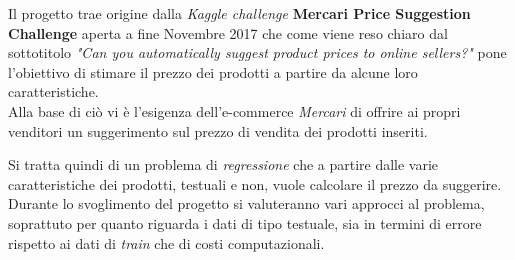 



Il progetto trae origine dalla \textit{Kaggle challenge} \textbf{Mercari Price
Suggestion Challenge}\cite{mercari-price-suggestion-challenge} aperta a fine
Novembre 2017 che come viene reso chiaro dal sottotitolo \textit{"Can you
automatically suggest product prices to online sellers?"} pone l'obiettivo di
stimare il prezzo dei prodotti a partire da alcune loro caratteristiche. \\
Alla base di ciò vi è l'esigenza dell'e-commerce \textit{Mercari}\cite{mercari}
di offrire ai propri venditori un suggerimento sul prezzo di vendita dei
prodotti inseriti.

Si tratta quindi di un problema di \textit{regressione} che a partire dalle
varie caratteristiche dei prodotti, testuali e non, vuole calcolare il prezzo da
suggerire.
\\
Durante lo svoglimento del progetto si valuteranno vari approcci al problema,
soprattuto per quanto riguarda i dati di tipo testuale, sia in termini di errore
rispetto ai dati di \textit{train} che di costi computazionali.